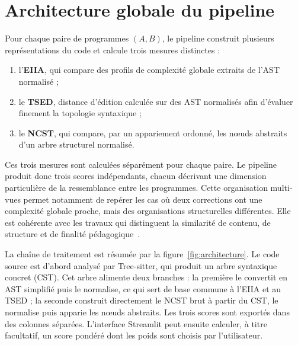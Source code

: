 \documentclass[12pt,a4paper,oneside]{report}
\begin{document}
\section{Architecture globale du pipeline}

Pour chaque paire de programmes $(A,B)$, le pipeline construit plusieurs
représentations du code et calcule trois mesures distinctes :
\begin{enumerate}
  \item l'\textbf{EIIA}, qui compare des profils de complexité globale
        extraits de l'AST normalisé ;
  \item le \textbf{TSED}, distance d'édition calculée sur des AST normalisés
        afin d'évaluer finement la topologie syntaxique ;
  \item le \textbf{NCST}, qui compare, par un appariement ordonné, les nœuds
        abstraits d'un arbre structurel normalisé.
\end{enumerate}

Ces trois mesures sont calculées séparément pour chaque paire. Le pipeline
produit donc trois scores indépendants, chacun décrivant une dimension
particulière de la ressemblance entre les programmes. Cette organisation
multi-vues permet notamment de repérer les cas où deux corrections ont une
complexité globale proche, mais des organisations structurelles différentes.
Elle est cohérente avec les travaux qui distinguent la similarité de contenu,
de structure et de finalité pédagogique~\cite{pelanek_2020,holyoak_surface_1987}.

La chaîne de traitement est résumée par la figure~\ref{fig:architecture}. Le
code source est d'abord analysé par Tree-sitter, qui produit un arbre
syntaxique concret (CST). Cet arbre alimente deux branches : la première le
convertit en AST simplifié puis le normalise, ce qui sert de base commune à
l'EIIA et au TSED ; la seconde construit directement le NCST brut à partir du
CST, le normalise puis apparie les nœuds abstraits. Les trois scores sont
exportés dans des colonnes séparées. L'interface Streamlit peut ensuite
calculer, à titre facultatif, un score pondéré dont les poids sont choisis par
l'utilisateur.
\end{document}
